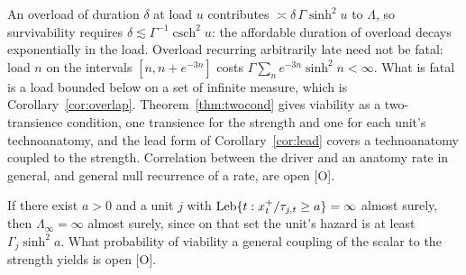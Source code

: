 \begin{remark}\label{rem:fluct}
An overload of duration $\delta$ at load $u$ contributes
$\asymp\delta\,\Gamma\sinh^2u$ to $\Lambda$, so survivability requires
$\delta\lesssim\Gamma^{-1}\operatorname{csch}^2u$: the affordable duration
of overload decays exponentially in the load. Overload recurring
arbitrarily late need not be fatal: load $n$ on the intervals
$[n,n+e^{-3n}]$ costs $\Gamma\sum_ne^{-3n}\sinh^2n<\infty$. What is fatal is
a load bounded below on a set of infinite measure, which is
Corollary~\ref{cor:overlap}. Theorem~\ref{thm:twocond} gives viability as
a two-transience condition, one transience for the strength and one for
each unit's technoanatomy, and the lead form of Corollary~\ref{cor:lead}
covers a technoanatomy coupled to the strength. Correlation between the
driver and an anatomy rate in general, and general null recurrence of a
rate, are open [O].
\end{remark}

\begin{corollary}\label{cor:overlap}
If there exist $a>0$ and a unit $j$ with
$\operatorname{Leb}\{t:x_t^+/\tau_{j,t}\ge a\}=\infty$ almost surely, then
$\Lambda_\infty=\infty$ almost surely, since on that set the unit's
hazard is at least $\Gamma_j\sinh^2a$. What probability of viability a
general coupling of the scalar to the strength yields is open [O].
\end{corollary}

